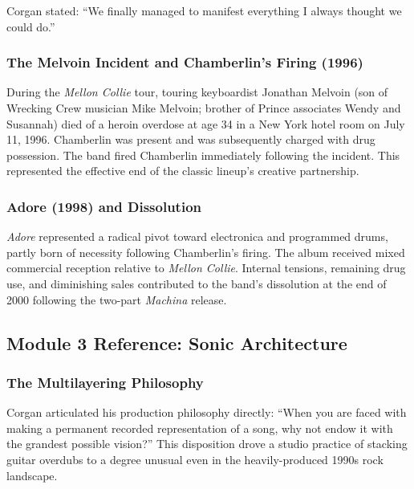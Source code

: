 \documentclass[11pt,letterpaper]{article}
\begin{document}
Corgan stated: ``We finally managed to manifest everything I always thought we could do.''

\subsubsection{The Melvoin Incident and Chamberlin's Firing (1996)}

During the \textit{Mellon Collie} tour, touring keyboardist Jonathan Melvoin (son of Wrecking Crew musician Mike Melvoin; brother of Prince associates Wendy and Susannah) died of a heroin overdose at age 34 in a New York hotel room on July 11, 1996. Chamberlin was present and was subsequently charged with drug possession. The band fired Chamberlin immediately following the incident. This represented the effective end of the classic lineup's creative partnership.

\subsubsection{Adore (1998) and Dissolution}

\textit{Adore} represented a radical pivot toward electronica and programmed drums, partly born of necessity following Chamberlin's firing. The album received mixed commercial reception relative to \textit{Mellon Collie}. Internal tensions, remaining drug use, and diminishing sales contributed to the band's dissolution at the end of 2000 following the two-part \textit{Machina} release.

\subsection{Module 3 Reference: Sonic Architecture}

\subsubsection{The Multilayering Philosophy}

Corgan articulated his production philosophy directly: ``When you are faced with making a permanent recorded representation of a song, why not endow it with the grandest possible vision?'' This disposition drove a studio practice of stacking guitar overdubs to a degree unusual even in the heavily-produced 1990s rock landscape.
\end{document}
